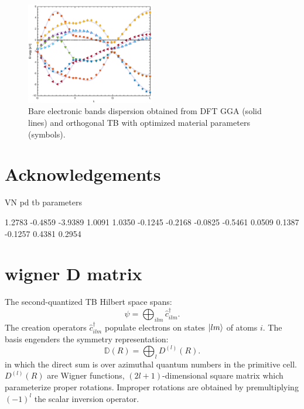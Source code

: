 \documentclass[twocolumn,showpacs,preprintnumbers,superscriptaddress,prb,floatfix,aps,10pt]{revtex4-1}
\newcommand*{\wignerD}{\mathbb{D}(R)}
\newcommand*{\wignerDl}{D^{(l)}(R)}
\begin{document}
\begin{figure}
\label{fig:kappa_vs_t}
\includegraphics[width=0.5\textwidth]{band_structure.eps}
\caption{Bare electronic bands dispersion obtained from DFT GGA (solid lines) and orthogonal TB with optimized material parameters (symbols). } 
\end{figure}



\section{Acknowledgements}



\clearpage

VN pd tb parameters

    1.2783
   -0.4859
   -3.9389
    1.0091
    1.0350
   -0.1245
   -0.2168
   -0.0825
   -0.5461
    0.0509
    0.1387
   -0.1257
    0.4381
    0.2954




\appendix

%
%
\section{wigner D matrix} 
\label{appendix:wigner}

The second-quantized TB Hilbert space spans:
%
\begin{equation}
\psi = \bigoplus_{ilm} \hat{c}_{ilm}^\dag.
\end{equation}
%
The creation operators $\hat{c}_{ilm}^\dag$ populate electrons on states $\ket{lm}$ of atoms $i$. The basis engenders the symmetry representation:
%
\begin{equation}
\wignerD = \bigoplus_l \wignerDl.
\end{equation}
%
in which the direct sum is over azimuthal quantum numbers in the primitive cell. $\wignerDl$ are Wigner functions, $(2l+1)$-dimensional square matrix which parameterize proper rotations. %
Improper rotations are obtained by premultiplying $(-1)^l$ the scalar inversion operator. \cite{sharma_general_1979,el-batanouny_symmetry_2008} 
\end{document}
